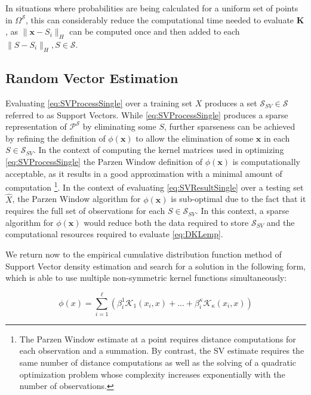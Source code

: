 \documentclass[10pt]{article}
\begin{document}
In situations where probabilities are being calculated for a uniform set of points in \( \Omega^{\mathcal{S}} \), this can considerably reduce the computational time needed to evaluate \( \mathbf{K} \), as \( \|\mathbf{x} - S_i \|_H \) can be computed once and then added to each \( \|S - S_i\|_H, S \in \mathcal{S} \).


\subsection{ Random Vector Estimation }
 
Evaluating \ref{eq:SVProcessSingle} over a training set \( X \) produces a set \( \mathcal{S}_{SV} \in \mathcal{S} \) referred to as Support Vectors.  While \ref{eq:SVProcessSingle} produces a sparse representation of \( \mathcal{P}^\mathcal{S} \) by eliminating some \( S \), further sparseness can be achieved by refining the definition of \( \phi(\mathbf{x}) \) to allow the elimination of some \( \mathbf{x} \) in each \( S \in \mathcal{S}_{SV} \).  In the context of computing the kernel matrices used in optimizing \ref{eq:SVProcessSingle} the Parzen Window definition of \( \phi(\mathbf{x}) \) is computationally acceptable, as it results in a good approximation with a minimal amount of computation \footnote{ The Parzen Window estimate at a point requires distance computations for each observation and a summation.  By contrast, the SV estimate requires the same number of distance computations as well as the solving of a quadratic optimization problem whose complexity increases exponentially with the number of observations. }.  In the context of evaluating \ref{eq:SVResultSingle} over a testing set \( \hat{X} \), the Parzen Window algorithm for \( \phi(\mathbf{x}) \) is sub-optimal due to the fact that it requires the full set of observations for each \( S \in \mathcal{S}_{SV} \).  In this context, a sparse algorithm for \( \phi(\mathbf{x}) \) would reduce both the data required to store \( \mathcal{S}_{SV} \) and the computational resources required to evaluate \ref{eq:DKLemp}.

We return now to the empirical cumulative distribution function method of Support Vector density estimation and search for a solution in the following form, which is able to use multiple non-symmetric kernel functions simultaneously:

\begin{equation} \label{eq:SVDensity}
\phi(x) = \sum_{i=1}^\ell \left( \beta_i^1 \mathcal{K}_1(x_i,x) + ... + \beta_i^\kappa \mathcal{K}_\kappa( x_i,x) \right)
\end{equation}
\end{document}
